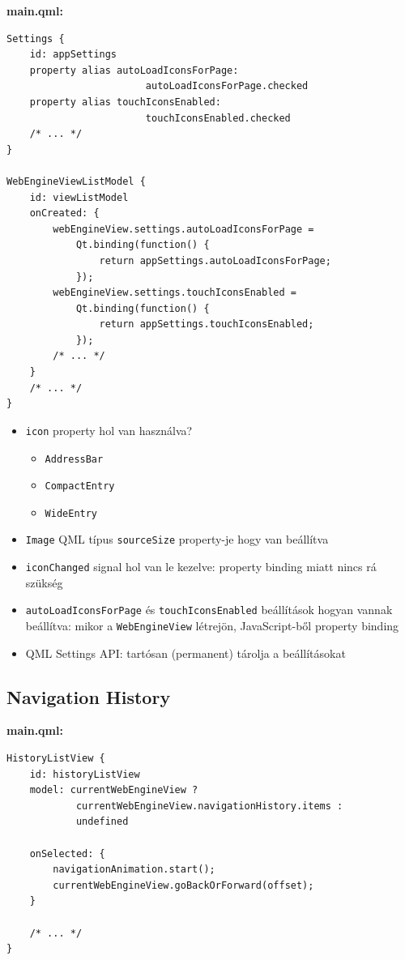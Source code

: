 \documentclass[12pt]{report}
\begin{document}
\noindent
\textbf{main.qml:}
\begin{verbatim}
Settings {
    id: appSettings
    property alias autoLoadIconsForPage:
                        autoLoadIconsForPage.checked
    property alias touchIconsEnabled:
                        touchIconsEnabled.checked
    /* ... */
}

WebEngineViewListModel {
    id: viewListModel
    onCreated: {
        webEngineView.settings.autoLoadIconsForPage =
            Qt.binding(function() {
                return appSettings.autoLoadIconsForPage;
            });
        webEngineView.settings.touchIconsEnabled =
            Qt.binding(function() {
                return appSettings.touchIconsEnabled;
            });
        /* ... */
    }
    /* ... */
}
\end{verbatim}

\begin{itemize}
    \item \texttt{icon} property hol van használva?
        \begin{itemize}
            \item \texttt{AddressBar}
            \item \texttt{CompactEntry}
            \item \texttt{WideEntry}
        \end{itemize}
    \item \texttt{Image} QML típus \texttt{sourceSize} property-je hogy van beállítva
    \item \texttt{iconChanged} signal hol van le kezelve: property binding miatt nincs rá
        szükség
    \item \texttt{autoLoadIconsForPage} és \texttt{touchIconsEnabled} beállítások hogyan
        vannak beállítva: mikor a \texttt{WebEngineView} létrejön, JavaScript-ből property
        binding
    \item QML Settings API: tartósan (permanent) tárolja a beállításokat
\end{itemize}

\subsection{Navigation History}

\noindent
\textbf{main.qml:}
\begin{verbatim}
HistoryListView {
    id: historyListView
    model: currentWebEngineView ?
            currentWebEngineView.navigationHistory.items :
            undefined

    onSelected: {
        navigationAnimation.start();
        currentWebEngineView.goBackOrForward(offset);
    }

    /* ... */
}
\end{verbatim}
\end{document}
